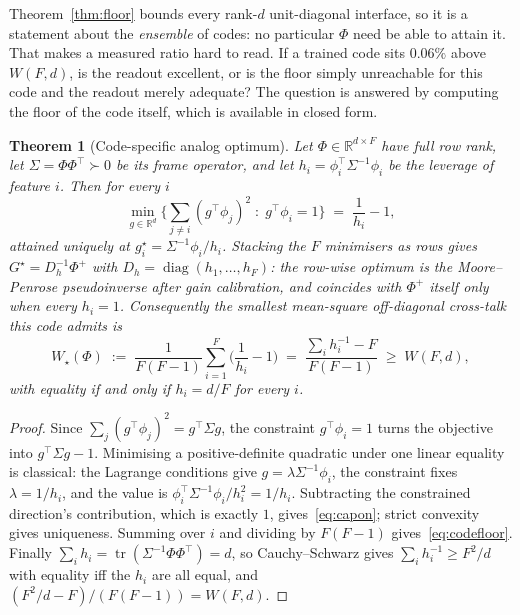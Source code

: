 \documentclass[preprint,12pt]{elsarticle}
\newtheorem{theorem}{Theorem}[section]
\theoremstyle{definition}
\newcommand{\R}{\mathbb{R}}
\begin{document}
Theorem~\ref{thm:floor} bounds every rank-$d$ unit-diagonal interface, so it is a statement
about the \emph{ensemble} of codes: no particular $\Phi$ need be able to attain it. That makes a
measured ratio hard to read. If a trained code sits $0.06\%$ above $W(F,d)$, is the readout
excellent, or is the floor simply unreachable for this code and the readout merely adequate? The
question is answered by computing the floor of the code itself, which is available in closed
form.

\begin{theorem}[Code-specific analog optimum]
\label{thm:codefloor}
Let $\Phi\in\R^{d\times F}$ have full row rank, let $\Sigma=\Phi\Phi^{\top}\succ0$ be its frame
operator, and let $h_i=\phi_i^{\top}\Sigma^{-1}\phi_i$ be the leverage of feature $i$. Then for
every $i$
\begin{equation}
  \min_{g\in\R^d}\Big\{\sum_{j\neq i}(g^{\top}\phi_j)^2 \;:\; g^{\top}\phi_i=1\Big\}
  \;=\;\frac{1}{h_i}-1,
  \label{eq:capon}
\end{equation}
attained uniquely at $g_i^{\star}=\Sigma^{-1}\phi_i/h_i$. Stacking the $F$ minimisers as rows gives
$G^{\star}=D_h^{-1}\Phi^{+}$ with $D_h=\operatorname{diag}(h_1,\dots,h_F)$: the row-wise optimum is
the Moore--Penrose pseudoinverse \emph{after} gain calibration, and coincides with $\Phi^{+}$ itself
only when every $h_i=1$. Consequently the smallest mean-square off-diagonal cross-talk this code
admits is
\begin{equation}
  W_{\star}(\Phi)\;:=\;\frac{1}{F(F-1)}\sum_{i=1}^{F}\Big(\frac1{h_i}-1\Big)
  \;=\;\frac{\sum_i h_i^{-1}-F}{F(F-1)}\;\ge\;W(F,d),
  \label{eq:codefloor}
\end{equation}
with equality if and only if $h_i=d/F$ for every $i$.
\end{theorem}

\begin{proof}
Since $\sum_{j}(g^{\top}\phi_j)^2=g^{\top}\Sigma g$, the constraint $g^{\top}\phi_i=1$ turns the
objective into $g^{\top}\Sigma g-1$. Minimising a positive-definite quadratic under one linear
equality is classical: the Lagrange conditions give $g=\lambda\Sigma^{-1}\phi_i$, the constraint
fixes $\lambda=1/h_i$, and the value is $\phi_i^{\top}\Sigma^{-1}\phi_i/h_i^2=1/h_i$. Subtracting
the constrained direction's contribution, which is exactly $1$, gives~\eqref{eq:capon}; strict
convexity gives uniqueness. Summing over $i$ and dividing by $F(F-1)$
gives~\eqref{eq:codefloor}. Finally $\sum_ih_i=\operatorname{tr}(\Sigma^{-1}\Phi\Phi^{\top})=d$,
so Cauchy--Schwarz gives $\sum_ih_i^{-1}\ge F^2/d$ with equality iff the $h_i$ are all equal,
and $(F^2/d-F)/(F(F-1))=W(F,d)$.
\end{proof}
\end{document}
